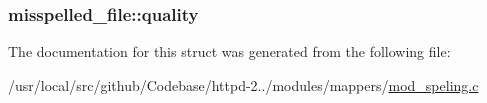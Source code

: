 \subsubsection[{\texorpdfstring{quality}{quality}}]{ misspelled\+\_\+file\+::quality}\hypertarget{structmisspelled__file_a3c913b520290ca13241ecd9eb04e5f73}{}\label{structmisspelled__file_a3c913b520290ca13241ecd9eb04e5f73}


The documentation for this struct was generated from the following file\+:\begin{DoxyCompactItemize}
\item 
/usr/local/src/github/\+Codebase/httpd-\/2../modules/mappers/\hyperlink{mod__speling_8c}{mod\+\_\+speling.\+c}\end{DoxyCompactItemize}
